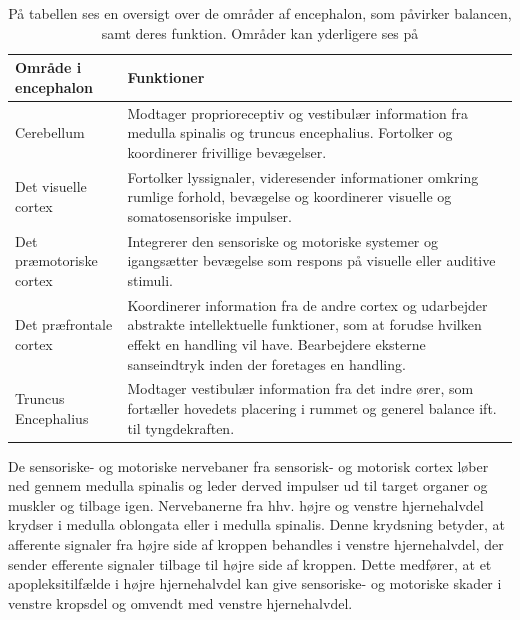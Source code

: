 \begin{center}
\begin{table} [H]
  \begin{tabular}{ | l | p{10cm} |}
    \hline
    \textbf{Område i encephalon} & \textbf{Funktioner} \\ \hline
 	Cerebellum & Modtager proprioreceptiv og vestibulær information fra medulla spinalis og truncus encephalius.  Fortolker og koordinerer frivillige bevægelser. \\ \hline
 	Det visuelle cortex & Fortolker lyssignaler, videresender informationer omkring rumlige forhold, bevægelse og koordinerer visuelle og somatosensoriske impulser. \\ \hline
 	Det præmotoriske cortex & Integrerer den sensoriske og motoriske systemer og igangsætter bevægelse som respons på visuelle eller auditive stimuli. \\ \hline
 	Det præfrontale cortex & Koordinerer information fra de andre cortex og udarbejder abstrakte intellektuelle funktioner, som at forudse hvilken effekt en handling vil have. Bearbejdere eksterne sanseindtryk inden der foretages en handling. \\ \hline
 	Truncus Encephalius & Modtager vestibulær information fra det indre ører, som fortæller hovedets placering i rummet og generel balance ift. til tyngdekraften. \\
    \hline
    \end{tabular}
    \caption{På tabellen ses en oversigt over de områder af encephalon, som påvirker balancen, samt deres funktion. Områder kan yderligere ses på  \cite{Martini2012, Moos2010}}
    \label{tabelencephalon}
\end{table}
\end{center}
De sensoriske- og motoriske nervebaner fra sensorisk- og motorisk cortex løber ned gennem medulla spinalis og leder derved impulser ud til target organer og muskler og tilbage igen. Nervebanerne fra hhv. højre og venstre hjernehalvdel krydser i medulla oblongata eller i medulla spinalis. Denne krydsning betyder, at afferente signaler fra højre side af kroppen behandles i venstre hjernehalvdel, der sender efferente signaler tilbage til højre side af kroppen. \cite{Martini2012,Stanfield2014} Dette medfører, at et apopleksitilfælde i højre hjernehalvdel kan give sensoriske- og motoriske skader i venstre kropsdel og omvendt med venstre hjernehalvdel. \cite{Sundhedsstyrelsen2009,Nichols1997} %

